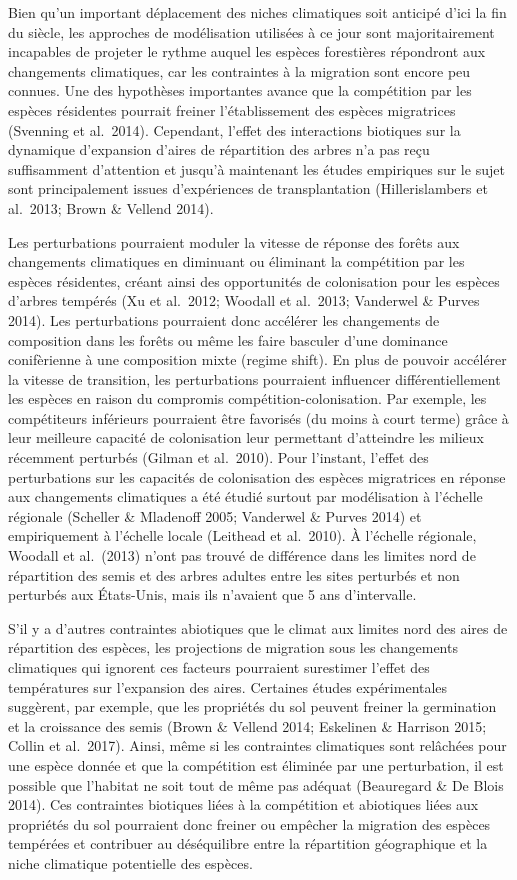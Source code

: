 \documentclass[
]{article}
\begin{document}
Bien qu'un important déplacement des niches climatiques soit anticipé
d'ici la fin du siècle, les approches de modélisation utilisées à ce
jour sont majoritairement incapables de projeter le rythme auquel les
espèces forestières répondront aux changements climatiques, car les
contraintes à la migration sont encore peu connues. Une des hypothèses
importantes avance que la compétition par les espèces résidentes
pourrait freiner l'établissement des espèces migratrices (Svenning et
al.~2014). Cependant, l'effet des interactions biotiques sur la
dynamique d'expansion d'aires de répartition des arbres n'a pas reçu
suffisamment d'attention et jusqu'à maintenant les études empiriques sur
le sujet sont principalement issues d'expériences de transplantation
(Hillerislambers et al.~2013; Brown \& Vellend 2014).

Les perturbations pourraient moduler la vitesse de réponse des forêts
aux changements climatiques en diminuant ou éliminant la compétition par
les espèces résidentes, créant ainsi des opportunités de colonisation
pour les espèces d'arbres tempérés (Xu et al.~2012; Woodall et al.~2013;
Vanderwel \& Purves 2014). Les perturbations pourraient donc accélérer
les changements de composition dans les forêts ou même les faire
basculer d'une dominance conifèrienne à une composition mixte (regime
shift). En plus de pouvoir accélérer la vitesse de transition, les
perturbations pourraient influencer différentiellement les espèces en
raison du compromis compétition-colonisation. Par exemple, les
compétiteurs inférieurs pourraient être favorisés (du moins à court
terme) grâce à leur meilleure capacité de colonisation leur permettant
d'atteindre les milieux récemment perturbés (Gilman et al.~2010). Pour
l'instant, l'effet des perturbations sur les capacités de colonisation
des espèces migratrices en réponse aux changements climatiques a été
étudié surtout par modélisation à l'échelle régionale (Scheller \&
Mladenoff 2005; Vanderwel \& Purves 2014) et empiriquement à l'échelle
locale (Leithead et al.~2010). À l'échelle régionale, Woodall et
al.~(2013) n'ont pas trouvé de différence dans les limites nord de
répartition des semis et des arbres adultes entre les sites perturbés et
non perturbés aux États-Unis, mais ils n'avaient que 5 ans d'intervalle.

S'il y a d'autres contraintes abiotiques que le climat aux limites nord
des aires de répartition des espèces, les projections de migration sous
les changements climatiques qui ignorent ces facteurs pourraient
surestimer l'effet des températures sur l'expansion des aires. Certaines
études expérimentales suggèrent, par exemple, que les propriétés du sol
peuvent freiner la germination et la croissance des semis (Brown \&
Vellend 2014; Eskelinen \& Harrison 2015; Collin et al.~2017). Ainsi,
même si les contraintes climatiques sont relâchées pour une espèce
donnée et que la compétition est éliminée par une perturbation, il est
possible que l'habitat ne soit tout de même pas adéquat (Beauregard \&
De Blois 2014). Ces contraintes biotiques liées à la compétition et
abiotiques liées aux propriétés du sol pourraient donc freiner ou
empêcher la migration des espèces tempérées et contribuer au
déséquilibre entre la répartition géographique et la niche climatique
potentielle des espèces.
\end{document}
